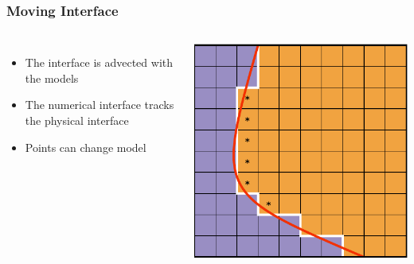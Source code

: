 \documentclass{beamer}
\begin{document}
\begin{frame}
\frametitle{Moving Interface}
\begin{columns}
\begin{itemize}
\item{The interface is advected with the models}
\item{The numerical interface tracks the physical interface}
\item{Points can change model}
\end{itemize}
\includegraphics[width=\textwidth]{../images/multimodel_captured_2.pdf}
\end{columns}
\end{frame}
\end{document}
